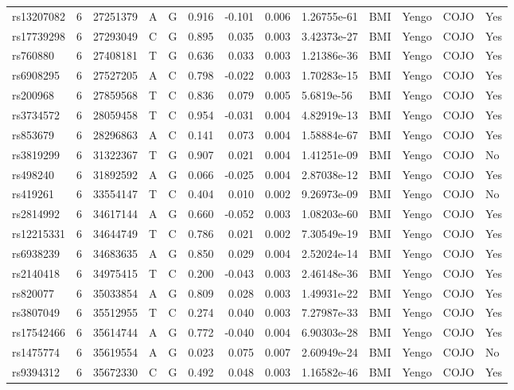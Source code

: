 \documentclass[11pt,twoside]{bristolthesis}
\begin{document}
\begin{longtable}[t]{lrlllrrrlllll}
rs13207082 & 6 & 27251379 & A & G & 0.916 & -0.101 & 0.006 & 1.26755e-61 & BMI & Yengo & COJO & Yes\\
\addlinespace
rs17739298 & 6 & 27293049 & C & G & 0.895 & 0.035 & 0.003 & 3.42373e-27 & BMI & Yengo & COJO & Yes\\
rs760880 & 6 & 27408181 & T & G & 0.636 & 0.033 & 0.003 & 1.21386e-36 & BMI & Yengo & COJO & Yes\\
rs6908295 & 6 & 27527205 & A & C & 0.798 & -0.022 & 0.003 & 1.70283e-15 & BMI & Yengo & COJO & Yes\\
rs200968 & 6 & 27859568 & T & C & 0.836 & 0.079 & 0.005 & 5.6819e-56 & BMI & Yengo & COJO & Yes\\
rs3734572 & 6 & 28059458 & T & C & 0.954 & -0.031 & 0.004 & 4.82919e-13 & BMI & Yengo & COJO & Yes\\
\addlinespace
rs853679 & 6 & 28296863 & A & C & 0.141 & 0.073 & 0.004 & 1.58884e-67 & BMI & Yengo & COJO & Yes\\
rs3819299 & 6 & 31322367 & T & G & 0.907 & 0.021 & 0.004 & 1.41251e-09 & BMI & Yengo & COJO & No\\
rs498240 & 6 & 31892592 & A & G & 0.066 & -0.025 & 0.004 & 2.87038e-12 & BMI & Yengo & COJO & Yes\\
rs419261 & 6 & 33554147 & T & C & 0.404 & 0.010 & 0.002 & 9.26973e-09 & BMI & Yengo & COJO & No\\
rs2814992 & 6 & 34617144 & A & G & 0.660 & -0.052 & 0.003 & 1.08203e-60 & BMI & Yengo & COJO & Yes\\
\addlinespace
rs12215331 & 6 & 34644749 & T & C & 0.786 & 0.021 & 0.002 & 7.30549e-19 & BMI & Yengo & COJO & Yes\\
rs6938239 & 6 & 34683635 & A & G & 0.850 & 0.029 & 0.004 & 2.52024e-14 & BMI & Yengo & COJO & Yes\\
rs2140418 & 6 & 34975415 & T & C & 0.200 & -0.043 & 0.003 & 2.46148e-36 & BMI & Yengo & COJO & Yes\\
rs820077 & 6 & 35033854 & A & G & 0.809 & 0.028 & 0.003 & 1.49931e-22 & BMI & Yengo & COJO & Yes\\
rs3807049 & 6 & 35512955 & T & C & 0.274 & 0.040 & 0.003 & 7.27987e-33 & BMI & Yengo & COJO & Yes\\
\addlinespace
rs17542466 & 6 & 35614744 & A & G & 0.772 & -0.040 & 0.004 & 6.90303e-28 & BMI & Yengo & COJO & Yes\\
rs1475774 & 6 & 35619554 & A & G & 0.023 & 0.075 & 0.007 & 2.60949e-24 & BMI & Yengo & COJO & No\\
rs9394312 & 6 & 35672330 & C & G & 0.492 & 0.048 & 0.003 & 1.16582e-46 & BMI & Yengo & COJO & Yes\\

\end{longtable}
\end{document}
